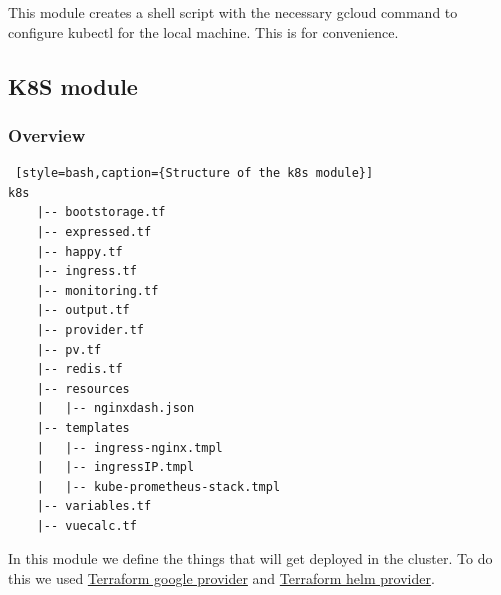 \documentclass[12pt,a4paper,oneside]{report}
\begin{document}
This module creates a shell script with the necessary gcloud command to configure kubectl for the local machine. This is for convenience.

\subsection{K8S module}
\subsubsection{Overview}
\begin{lstlisting} [style=bash,caption={Structure of the k8s module}]
k8s
    |-- bootstorage.tf
    |-- expressed.tf
    |-- happy.tf
    |-- ingress.tf
    |-- monitoring.tf
    |-- output.tf
    |-- provider.tf
    |-- pv.tf
    |-- redis.tf
    |-- resources
    |   |-- nginxdash.json
    |-- templates
    |   |-- ingress-nginx.tmpl
    |   |-- ingressIP.tmpl
    |   |-- kube-prometheus-stack.tmpl
    |-- variables.tf
    |-- vuecalc.tf
\end{lstlisting}

In this module we define the things that will get deployed in the cluster.
To do this we used \href{https://registry.terraform.io/providers/hashicorp/kubernetes/latest}{Terraform google provider} and \href{https://registry.terraform.io/providers/hashicorp/helm/latest}{Terraform helm provider}.
\end{document}
